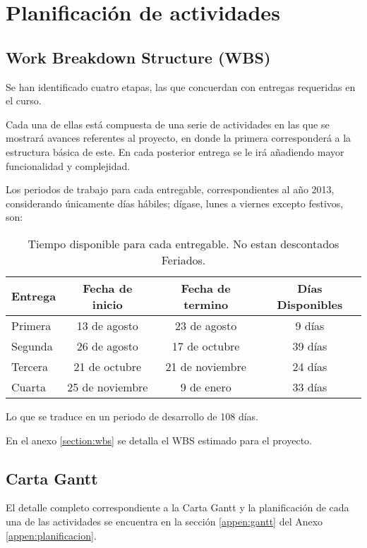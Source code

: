 \chapter{Planificaci\'on de actividades}
\newpage
\section{Work Breakdown Structure (WBS)}

Se han identificado cuatro etapas, las que concuerdan con entregas requeridas en el curso.

Cada una de ellas est\'a compuesta de una serie de actividades en las que se mostrar\'a avances referentes al proyecto, en donde la primera corresponder\'a a la estructura b\'asica de este. En cada posterior entrega se le ir\'a a\~nadiendo mayor funcionalidad y complejidad.

Los periodos de trabajo para cada entregable, correspondientes al a\~no 2013, considerando \'unicamente d\'ias h\'abiles; d\'igase, lunes a viernes excepto festivos, son:

\begin{table}[H]
  \centering
  \begin{tabular}{|l|c|c|c|}\hline
    {\bf Entrega} & {\bf Fecha de inicio} & {\bf Fecha de termino} & {\bf D\'ias Disponibles}\\\hline
    Primera & 13 de agosto    & 23 de agosto    &  9 d\'ias \\\hline
    Segunda & 26 de agosto    & 17 de octubre   & 39 d\'ias \\\hline 
    Tercera & 21 de octubre   & 21 de noviembre & 24 d\'ias \\\hline 
    Cuarta  & 25 de noviembre & 9 de enero      & 33 d\'ias \\\hline 
  \end{tabular}
  \label{tab:Fechas}
  \caption[~Tiempo Disponible para Entregables]{Tiempo disponible para cada entregable. No estan descontados Feriados.}
\end{table}

Lo que se traduce en un periodo de desarrollo de 108 d\'ias.

En el anexo \ref{section:wbs} se detalla el WBS estimado para el proyecto.


\section{Carta Gantt}
El detalle completo correspondiente a la Carta Gantt y la planificaci\'on de cada una de las actividades se encuentra en la secci\'on \ref{appen:gantt} del Anexo \ref{appen:planificacion}.

